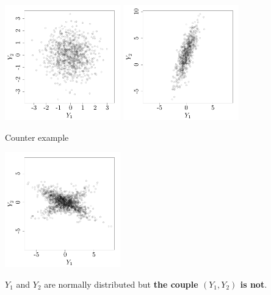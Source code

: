 \begin{frame}{}
\begin{example}
\begin{center}
 \includegraphics[height=5cm]{1_stat_models/figures/R/MVN_gaussvec2} \quad \includegraphics[height=5cm]{1_stat_models/figures/R/MVN_gaussvec1}
\end{center}
\end{example}
\end{frame}

\begin{frame}{}
\begin{exampleblock}{Counter example}
\begin{center}
 \includegraphics[height=5cm]{1_stat_models/figures/R/MVN_gaussvec3}
\end{center}
$Y_1$ and $Y_2$ are normally distributed but \textbf{the couple $(Y_1,Y_2)$ is not}.
\end{exampleblock}
\end{frame}


